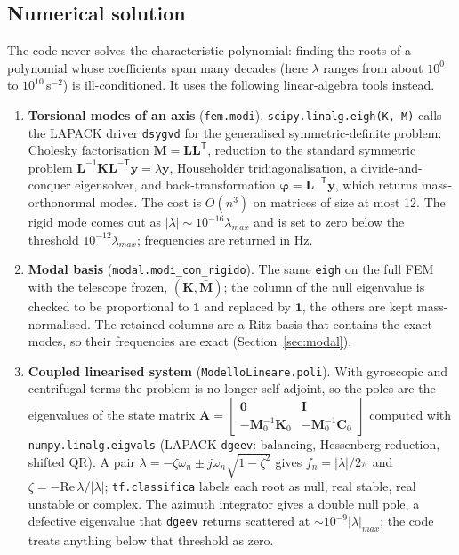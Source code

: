 \documentclass[10pt,a4paper]{article}
\numberwithin{equation}{section}
\begin{document}
\subsection{Numerical solution}
The code never solves the characteristic polynomial: finding the roots of a polynomial whose coefficients span many decades (here $\lambda$ ranges from about $10^{0}$ to $10^{10}$\,s$^{-2}$) is ill-conditioned. It uses the following linear-algebra tools instead.
\begin{enumerate}
\item \textbf{Torsional modes of an axis} (\texttt{fem.modi}). \texttt{scipy.linalg.eigh(K, M)} calls the LAPACK driver \texttt{dsygvd} for the generalised symmetric-definite problem: Cholesky factorisation $\mathbf M = \mathbf L\mathbf L^{\mathsf T}$, reduction to the standard symmetric problem $\mathbf L^{-1}\mathbf K\mathbf L^{-\mathsf T}\mathbf y = \lambda\mathbf y$, Householder tridiagonalisation, a divide-and-conquer eigensolver, and back-transformation $\boldsymbol\varphi = \mathbf L^{-\mathsf T}\mathbf y$, which returns mass-orthonormal modes. The cost is $O(n^3)$ on matrices of size at most 12. The rigid mode comes out as $|\lambda| \sim 10^{-16}\lambda_{max}$ and is set to zero below the threshold $10^{-12}\lambda_{max}$; frequencies are returned in Hz.
\item \textbf{Modal basis} (\texttt{modal.modi\_con\_rigido}). The same \texttt{eigh} on the full FEM with the telescope frozen, $(\mathbf K, \bar{\mathbf M})$; the column of the null eigenvalue is checked to be proportional to $\mathbf 1$ and replaced by $\mathbf 1$, the others are kept mass-normalised. The retained columns are a Ritz basis that contains the exact modes, so their frequencies are exact (Section~\ref{sec:modal}).
\item \textbf{Coupled linearised system} (\texttt{ModelloLineare.poli}). With gyroscopic and centrifugal terms the problem is no longer self-adjoint, so the poles are the eigenvalues of the state matrix $\mathbf A = \begin{bmatrix}\mathbf 0 & \mathbf I\\ -\mathbf M_0^{-1}\mathbf K_0 & -\mathbf M_0^{-1}\mathbf C_0\end{bmatrix}$ computed with \texttt{numpy.linalg.eigvals} (LAPACK \texttt{dgeev}: balancing, Hessenberg reduction, shifted QR). A pair $\lambda = -\zeta\omega_n \pm j\omega_n\sqrt{1-\zeta^2}$ gives $f_n = |\lambda|/2\pi$ and $\zeta = -\mathrm{Re}\,\lambda/|\lambda|$; \texttt{tf.classifica} labels each root as null, real stable, real unstable or complex. The azimuth integrator gives a double null pole, a defective eigenvalue that \texttt{dgeev} returns scattered at $\sim10^{-9}|\lambda|_{max}$; the code treats anything below that threshold as zero.

\end{enumerate}
\end{document}
